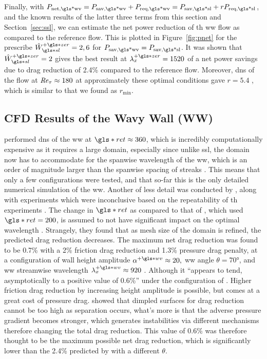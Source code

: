 Finally, with $P_\text{net,\gls*{wv}} = P_\text{sav,\gls*{wv}} +P_\text{req,\gls*{wv}} =P_\text{sav,\gls*{sl}} +rP_\text{req,\gls*{sl}} $, and the known results of the latter three terms from this section and Section~\ref{sec:ssl}, we can estimate the net power reduction of th \gls*{ww} flow as compared to the reference flow. This is plotted in Figure~\ref{fig:pnet} for the prescribe $\hat{W}\pz\ssl=2,6$ for $ P_\text{sav,\gls*{wv}}=P_\text{sav,\gls*{sl}} $. It was shown that $\hat{W}\pz\ssl=2$ gives the best result at $\lambda_x\pz=1520$ of a net power savings due to drag reduction of 2.4\% compared to the reference flow. Moreover, \gls*{dns} of the flow at $\mbox{\textit{Re}}_{\tau}\approx180$ at approximately these optimal conditions gave $r=5.4$ \cite{ghebali2018}, which is similar to that we found as $r_\text{min} $.


\subsection{CFD Results of the Wavy Wall (WW)}\label{sec:cfdww}
\textcite{ghebali2017} performed \gls*{dns} of the \gls*{ww} at $ \gls*{ret}\approx360$, which is incredibly computationally expensive as it requires a large domain, especially since unlike \gls*{ssl}, the domain now has to accommodate for the spanwise wavelength of the \gls*{ww}, which is an order of magnitude larger than the spanwise spacing of streaks \cite{chernyshenko2013,chernyshenko2005}. This means that only a few configurations were tested, and that so-far this is the only detailed numerical simulation of the \gls*{ww}. Another of less detail was conducted by \textcite{denison2015}, along with experiments which were inconclusive based on the repeatability of th experiments \cite{ghebali2017}. The change in $ \gls*{ret}$ as compared to that of \vqt, which used $ \gls*{ret}=200$, is assumed to not have significant impact on the optimal wavelength \sgc. Strangely, they found that as mesh size of the domain is refined, the predicted drag reduction decreases. The maximum net drag reduction was found to be 0.7\% with a 2\% friction drag reduction and 1.3\% pressure drag penalty, at a configuration of wall height amplitude $\alpha\pw\approx 20,$ \gls*{ww} angle  $\theta=\ang{70}$, and \gls*{ww} streamwise wavelength $\lambda\pw_x\approx920$ \sgc. Although it ``appears to tend, asymptotically to a positive value of 0.6\%'' under the configuration of \sgc. Higher friction drag reduction by increasing height amplitude is possible, but comes at a great cost of pressure drag. \textcite{vannesselrooij2016} showed that dimpled surfaces for drag reduction cannot be too high as separation occurs, what's more is that the adverse pressure gradient becomes stronger, which generates instabilities via different mechanisms therefore changing the total drag reduction. %
This value of 0.6\% was therefore thought to be the maximum possible net drag reduction, which is significantly lower than the 2.4\% predicted by \textcite{chernyshenko2013} with a different $\theta$.

